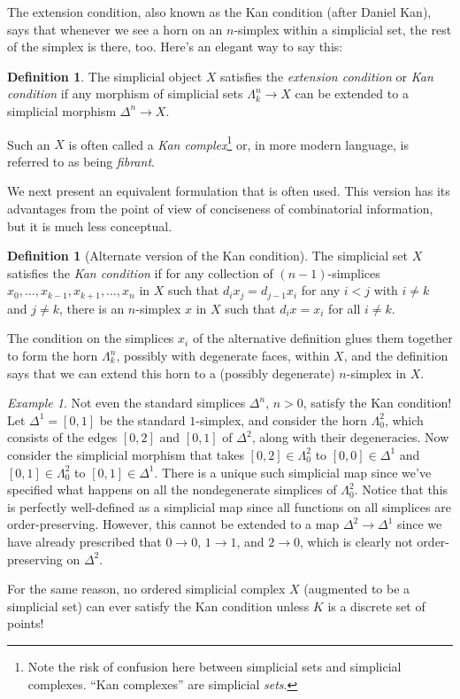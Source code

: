 \documentclass[12pt]{article}
\theoremstyle{plain}
\theoremstyle{definition}
\newtheorem{definition}[theorem]{Definition}
\theoremstyle{remark}
\newtheorem{example}[theorem]{Example}
\begin{document}
The extension condition, also known as the Kan condition (after Daniel Kan), says that whenever we see a horn on an $n$-simplex within a simplicial set, the rest of the simplex is there, too. Here's an elegant way to say this:

\begin{definition}
The simplicial object $X$  satisfies the \emph{extension condition} or \emph{Kan condition} if any morphism of simplicial sets $\Lambda^n_k\to X$ can be extended to a simplicial morphism $\Delta^n\to X$.

Such an $X$ is often called a \emph{Kan complex}\footnote{Note the risk of confusion here between simplicial sets and simplicial complexes. ``Kan complexes'' are simplicial \emph{sets}.} or, in more modern language, is referred to as being \emph{fibrant}.  
\end{definition}

We next present an equivalent formulation that is often used. This version has its advantages from the point of view of conciseness of combinatorial information, but it is much less conceptual.

\begin{definition}[Alternate version of the Kan condition]
The simplicial set $X$ satisfies the  \emph{Kan condition} if for any collection of $(n-1)$-simplices $x_0,\ldots, x_{k-1}, x_{k+1}, \ldots, x_{n}$ in $X$ such that $d_ix_j=d_{j-1}x_i$ for any $i<j$ with $i\neq k$ and $j\neq k$, there is an $n$-simplex $x$ in $X$ such that $d_ix=x_i$ for all $i\neq k$. 
\end{definition}

The condition on the simplices $x_i$ of the alternative definition glues them together to form the horn $\Lambda_k^n$, possibly with degenerate faces, within $X$, and the definition says that we can extend this horn to a (possibly degenerate) $n$-simplex in $X$.



\begin{example}\label{E: not Kan}
Not even the standard simplices $\Delta^n$, $n>0$, satisfy the Kan condition! Let $\Delta^1=[0,1]$ be the standard $1$-simplex, and consider the horn $\Lambda^2_0$, which consists of the edges $[0,2]$ and $[0,1]$ of $\Delta^2$, along with their degeneracies. Now consider the simplicial morphism that takes $[0,2]\in\Lambda^2_0$ to $[0,0]\in \Delta^1$ and $[0,1]\in\Lambda^2_0$ to $[0,1]\in\Delta^1$. There is a unique such simplicial map since we've specified what happens on all the nondegenerate simplices of $\Lambda^2_0$.  Notice that this is perfectly well-defined as a simplicial map since all functions on all simplices are order-preserving. However, this cannot be extended to a map $\Delta^2\to \Delta^1$ since we have already prescribed that $0\to 0$, $1\to 1$, and $2\to 0$, which is clearly not order-preserving on $\Delta^2$. 

For the same reason, no ordered simplicial complex $X$ (augmented to be a simplicial set) can ever satisfy the Kan condition unless $K$ is a discrete set of points! 
\end{example}
\end{document}
